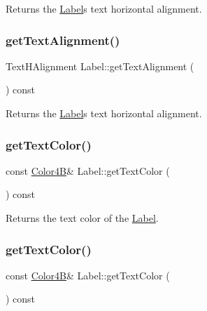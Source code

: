 Returns the \hyperlink{classLabel}{Label}\textquotesingle{}s text horizontal alignment. \mbox{\label{classLabel_aa23acedf74e98f051f47e76c3b1a088c}} 
\subsubsection{\texorpdfstring{get\+Text\+Alignment()}{getTextAlignment()}\hspace{0.1cm}{\footnotesize\ttfamily [2/2]}}
{\footnotesize\ttfamily Text\+H\+Alignment Label\+::get\+Text\+Alignment (\begin{DoxyParamCaption}{ }\end{DoxyParamCaption}) const\hspace{0.3cm}{\ttfamily [inline]}}

Returns the \hyperlink{classLabel}{Label}\textquotesingle{}s text horizontal alignment. \mbox{\label{classLabel_adb4e491a31a5c09c9ceb23a41797148a}} 
\subsubsection{\texorpdfstring{get\+Text\+Color()}{getTextColor()}\hspace{0.1cm}{\footnotesize\ttfamily [1/2]}}
{\footnotesize\ttfamily const \hyperlink{structColor4B}{Color4B}\& Label\+::get\+Text\+Color (\begin{DoxyParamCaption}{ }\end{DoxyParamCaption}) const\hspace{0.3cm}{\ttfamily [inline]}}

Returns the text color of the \hyperlink{classLabel}{Label}. \mbox{\label{classLabel_adb4e491a31a5c09c9ceb23a41797148a}} 
\subsubsection{\texorpdfstring{get\+Text\+Color()}{getTextColor()}\hspace{0.1cm}{\footnotesize\ttfamily [2/2]}}
{\footnotesize\ttfamily const \hyperlink{structColor4B}{Color4B}\& Label\+::get\+Text\+Color (\begin{DoxyParamCaption}{ }\end{DoxyParamCaption}) const\hspace{0.3cm}{\ttfamily [inline]}}

